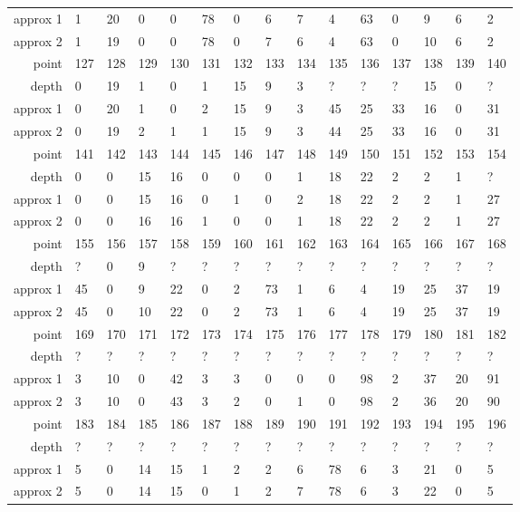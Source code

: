 \begin{center}
\begin{supertabular}{|r|l l l l l l l l l l l l l l|}
approx 1 & 1 & 20 & 0 & 0 & 78 & 0 & 6 & 7 & 4 & 63 & 0 & 9 & 6 & 2 \\
approx 2 & 1 & 19 & 0 & 0 & 78 & 0 & 7 & 6 & 4 & 63 & 0 & 10 & 6 & 2 \\
\hline
point & 127 & 128 & 129 & 130 & 131 & 132 & 133 & 134 & 135 & 136 & 137 & 138 & 139 & 140 \\
\hline
depth & 0 & 19 & 1 & 0 & 1 & 15 & 9 & 3 & ? & ? & ? & 15 & 0 & ? \\
approx 1 & 0 & 20 & 1 & 0 & 2 & 15 & 9 & 3 & 45 & 25 & 33 & 16 & 0 & 31 \\
approx 2 & 0 & 19 & 2 & 1 & 1 & 15 & 9 & 3 & 44 & 25 & 33 & 16 & 0 & 31 \\
\hline
point & 141 & 142 & 143 & 144 & 145 & 146 & 147 & 148 & 149 & 150 & 151 & 152 & 153 & 154 \\
\hline
depth & 0 & 0 & 15 & 16 & 0 & 0 & 0 & 1 & 18 & 22 & 2 & 2 & 1 & ? \\
approx 1 & 0 & 0 & 15 & 16 & 0 & 1 & 0 & 2 & 18 & 22 & 2 & 2 & 1 & 27 \\
approx 2 & 0 & 0 & 16 & 16 & 1 & 0 & 0 & 1 & 18 & 22 & 2 & 2 & 1 & 27 \\
\hline
point & 155 & 156 & 157 & 158 & 159 & 160 & 161 & 162 & 163 & 164 & 165 & 166 & 167 & 168 \\
\hline
depth & ? & 0 & 9 & ? & ? & ? & ? & ? & ? & ? & ? & ? & ? & ? \\
approx 1 & 45 & 0 & 9 & 22 & 0 & 2 & 73 & 1 & 6 & 4 & 19 & 25 & 37 & 19 \\
approx 2 & 45 & 0 & 10 & 22 & 0 & 2 & 73 & 1 & 6 & 4 & 19 & 25 & 37 & 19 \\
\hline
point & 169 & 170 & 171 & 172 & 173 & 174 & 175 & 176 & 177 & 178 & 179 & 180 & 181 & 182 \\
\hline
depth & ? & ? & ? & ? & ? & ? & ? & ? & ? & ? & ? & ? & ? & ? \\
approx 1 & 3 & 10 & 0 & 42 & 3 & 3 & 0 & 0 & 0 & 98 & 2 & 37 & 20 & 91 \\
approx 2 & 3 & 10 & 0 & 43 & 3 & 2 & 0 & 1 & 0 & 98 & 2 & 36 & 20 & 90 \\
\hline
point & 183 & 184 & 185 & 186 & 187 & 188 & 189 & 190 & 191 & 192 & 193 & 194 & 195 & 196 \\
\hline
depth & ? & ? & ? & ? & ? & ? & ? & ? & ? & ? & ? & ? & ? & ? \\
approx 1 & 5 & 0 & 14 & 15 & 1 & 2 & 2 & 6 & 78 & 6 & 3 & 21 & 0 & 5 \\
approx 2 & 5 & 0 & 14 & 15 & 0 & 1 & 2 & 7 & 78 & 6 & 3 & 22 & 0 & 5 \\

\end{supertabular}
\end{center}
